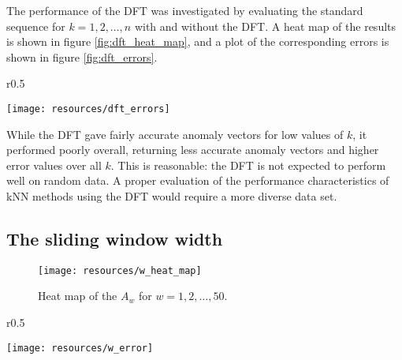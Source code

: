 The performance of the DFT was investigated by evaluating the standard sequence for $k = 1,2,\dots, n$ with and without the DFT. A heat map of the results is shown in figure \ref{fig:dft_heat_map}, and a plot of the corresponding errors is shown in figure \ref{fig:dft_errors}.

\begin{wrapfigure}{r}{0.5\textwidth}
    \vspace{-30pt}
    \begin{center}
        \texttt{[image: resources/dft\_errors]}
    \end{center}
    \vspace{-20pt}
    \caption{\small{Errors of the $A_{k, t}$.}}
    \vspace{-10pt}
    \label{fig:dft_errors}
\end{wrapfigure}

While the DFT gave fairly accurate anomaly vectors for low values of $k$, it performed poorly overall, returning less accurate anomaly vectors and higher error values over all $k$. This is reasonable: the DFT is not expected to perform well on random data. A proper evaluation of the performance characteristics of kNN methods using the DFT would require a more diverse data set.

\clearpage

\subsection{The sliding window width}
\FloatBarrier
\label{sect:w}

\begin{figure}[h]
    \vspace{-15pt}
    \begin{center}
        \texttt{[image: resources/w\_heat\_map]}
    \end{center}
    \vspace{-20pt}
    \caption{\small{Heat map of the $A_w$ for $w = 1, 2, \dots, 50$.}}
    \vspace{-10pt}
    \label{fig:w_heat_map}
\end{figure}

\begin{wrapfigure}{r}{0.5\textwidth}
    \vspace{-20pt}
    \begin{center}
        \texttt{[image: resources/w\_error]}
    \end{center}
    \vspace{-20pt}
    \caption{\small{Errors for the anomaly vectors $A_w$.}}
    \label{fig:w_error}
    \vspace{-20pt}
\end{wrapfigure}

